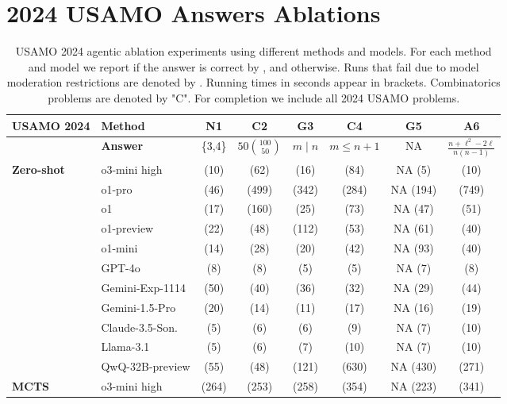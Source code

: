 \section{2024 USAMO Answers Ablations}
\label{appendix:D}
\begin{table}[H]
\caption{USAMO 2024 agentic ablation experiments using different methods and models. For each method and model we report if the answer is correct by \C, and \X otherwise. Runs that fail due to model moderation restrictions are denoted by \F. Running times in seconds appear in brackets. Combinatorics problems are denoted by "C". For completion we include all 2024 USAMO problems.}
  \centering
  \scriptsize
\begin{tabular}{llcccccc}
\toprule
{\bf USAMO 2024} & {\bf Method} & {\bf N1} & {\bf C2} & {\bf G3} & {\bf C4} & {\bf G5} & {\bf A6} \\    
\midrule
& \textbf{Answer} & \{3,4\} & $50 \binom{100}{50}$ & $m \mid n$ & $m \leq n + 1$ & NA & $\frac{n + \ell^2 - 2\ell}{n(n-1)}$ \\
\midrule
\textbf{Zero-shot} 
& o3-mini high & \C (10) & \X (62) & \X (16) & \X (84) & NA (5) & \X (10) \\
& o1-pro & \C (46) & \X (499) & \X (342) & \X (284) & NA (194) & \C (749) \\
& o1 & \C (17) & \X (160) & \X (25) & \X (73) & NA (47) & \X (51)\\ 
& o1-preview & \C (22) & \X (48) & \X (112) & \X (53) & NA (61) & \X (40) \\
& o1-mini & \C (14) & \X (28) & \X (20) & \X (42) & NA  (93) & \X (40) \\
& GPT-4o & \X (8) & \X (8) & \X (5) & \X (5) & NA (7) & \X (8) \\
& Gemini-Exp-1114 & \C (50) & \X (40) & \X (36) & \X (32) & NA (29) & \X (44)\\
& Gemini-1.5-Pro & \C (20) & \X (14) & \X (11) & \X (17) & NA (16) & \X (19) \\
& Claude-3.5-Son. & \X (5) & \X (6) & \X (6) & \X (9) & NA (7) & \X (10) \\
& Llama-3.1 & \X (5) & \X (6) & \X (7) & \X (10) & NA (7) & \X (10) \\
& QwQ-32B-preview & \C (55) & \X (48) & \X (121) & \X (630) & NA (430) & \X (271) \\
\midrule
\textbf{MCTS} 
& o3-mini high & \C (264) & \X (253) & \X (258) & \C (354) & NA (223) & \X (341) \\

\end{tabular}
\end{table}
